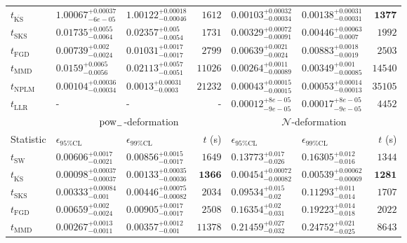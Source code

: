 \begin{tabular}{l|llr|llr}
	$t_{\overline{\mathrm{KS}}}$ & $1.00067_{-6e-05}^{+0.00037}$ & $1.00122_{-0.00046}^{+0.00018}$ & $1612$ & ${\mathbf{0.00103_{-0.00034}^{+0.00032}}}$ & ${\mathbf{0.00138_{-0.00031}^{+0.00031}}}$ & ${\mathbf{1377}}$ \\
	$t_{\mathrm{SKS}}$ & $0.01735_{-0.0064}^{+0.0055}$ & $0.02357_{-0.0054}^{+0.005}$ & $1731$ & $0.00329_{-0.00091}^{+0.00072}$ & $0.00446_{-0.0007}^{+0.00063}$ & $1992$ \\
	$t_{\mathrm{FGD}}$ & ${\mathbf{0.00739_{-0.0024}^{+0.002}}}$ & ${\mathbf{0.01031_{-0.0017}^{+0.0017}}}$ & $2799$ & $0.00639_{-0.0024}^{+0.0021}$ & $0.00883_{-0.0019}^{+0.0018}$ & $2503$ \\
	$t_{\mathrm{MMD}}$ & $0.0159_{-0.0056}^{+0.0065}$ & $0.02113_{-0.0051}^{+0.0057}$ & $11026$ & $0.00264_{-0.00089}^{+0.0011}$ & $0.00349_{-0.00085}^{+0.001}$ & $14540$ \\
\rowcolor{red!35}	$t_{\mathrm{NPLM}}$ & $0.00104_{-0.00034}^{+0.00036}$ & $0.0013_{-0.0003}^{+0.00031}$ & $21232$ & $0.00043_{-0.00015}^{+0.00015}$ & $0.00053_{-0.00013}^{+0.00014}$ & $35105$ \\
	$t_{\mathrm{LLR}}$ & - & - & - & $0.00012_{-9e-05}^{+8e-05}$ & $0.00017_{-9e-05}^{+8e-05}$ & $4452$ \\
	\toprule
	\multicolumn{1}{c}{} & \multicolumn{3}{c}{$\rm{pow}_{-}$-deformation} & \multicolumn{3}{c}{$\mathcal{N}$-deformation} \\
	Statistic & $\epsilon_{95\%\mathrm{CL}}$ & $\epsilon_{99\%\mathrm{CL}}$ & $t$ (s) & $\epsilon_{95\%\mathrm{CL}}$ & $\epsilon_{99\%\mathrm{CL}}$ & $t$ (s) \\
	\midrule
	$t_{\mathrm{SW}}$ & $0.00606_{-0.0021}^{+0.0017}$ & $0.00856_{-0.0017}^{+0.0015}$ & $1649$ & $0.13773_{-0.026}^{+0.017}$ & $0.16305_{-0.016}^{+0.012}$ & $1344$ \\
	$t_{\overline{\mathrm{KS}}}$ & ${\mathbf{0.00098_{-0.00037}^{+0.00037}}}$ & ${\mathbf{0.00133_{-0.00036}^{+0.00035}}}$ & ${\mathbf{1366}}$ & ${\mathbf{0.00454_{-0.00082}^{+0.00072}}}$ & ${\mathbf{0.00539_{-0.00069}^{+0.00062}}}$ & ${\mathbf{1281}}$ \\
	$t_{\mathrm{SKS}}$ & $0.00333_{-0.001}^{+0.00084}$ & $0.00446_{-0.00082}^{+0.00075}$ & $2034$ & $0.09534_{-0.02}^{+0.015}$ & $0.11293_{-0.014}^{+0.011}$ & $1707$ \\
	$t_{\mathrm{FGD}}$ & $0.00659_{-0.0024}^{+0.002}$ & $0.00905_{-0.0017}^{+0.0017}$ & $2508$ & $0.16354_{-0.031}^{+0.02}$ & $0.19223_{-0.018}^{+0.014}$ & $2022$ \\
	$t_{\mathrm{MMD}}$ & $0.00267_{-0.0011}^{+0.0013}$ & $0.00357_{-0.001}^{+0.0012}$ & $11378$ & $0.21459_{-0.032}^{+0.027}$ & $0.24752_{-0.025}^{+0.021}$ & $8643$ \\

\end{tabular}
